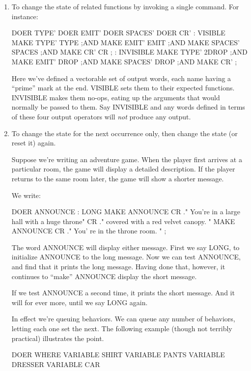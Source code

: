 \begin{enumerate}
\item To change the state of related functions by invoking a single command. For
instance:

\begin{Code}
DOER TYPE'
DOER EMIT'
DOER SPACES'
DOER CR'
: VISIBLE     MAKE TYPE'  TYPE ;AND
              MAKE EMIT'  EMIT ;AND
              MAKE SPACES'  SPACES ;AND
              MAKE CR'  CR ;
: INVISIBLE   MAKE TYPE'  2DROP ;AND
              MAKE EMIT'  DROP ;AND
              MAKE SPACES'  DROP ;AND
              MAKE CR'  ;
\end{Code}
Here we've defined a vectorable set of output words, each name having a
``prime'' mark at the end. VISIBLE sets them to their expected functions.
INVISIBLE makes them no-ops, eating up the arguments that would normally
be passed to them. Say INVISIBLE and any words defined in terms
of these four output operators will \emph{not} produce any output.

\item To change the state for the next occurrence only, then change the state (or
reset it) again.

Suppose we're writing an adventure game. When the player first arrives at
a particular room, the game will display a detailed description. If the player
returns to the same room later, the game will show a shorter message.

\goodbreak
We write:
\begin{Code}
DOER ANNOUNCE
: LONG MAKE ANNOUNCE
   CR ." You're in a large hall with a huge throne"
   CR  ." covered with a red velvet canopy. "
         MAKE ANNOUNCE
   CR ." You' re in the throne room. " ;
\end{Code}
The word ANNOUNCE will display either message. First we say LONG, to
initialize ANNOUNCE to the long message. Now we can test ANNOUNCE,
and find that it prints the long message. Having done that,
however, it continues to ``make'' ANNOUNCE display the short message.

If we test ANNOUNCE a second time, it prints the short message. And it
will for ever more, until we say LONG again.

In effect we're queuing behaviors. We can queue any number of behaviors,
letting each one set the next. The following example (though not terribly
practical) illustrates the point.

\begin{Code}
DOER WHERE
VARIABLE SHIRT
VARIABLE PANTS
VARIABLE DRESSER
VARIABLE CAR


\end{Code}
\end{enumerate}
